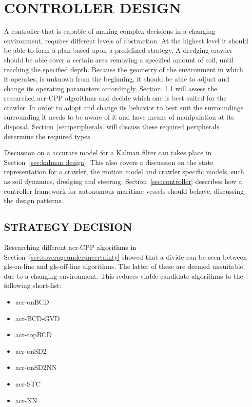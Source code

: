 \chapter{CONTROLLER DESIGN}\label{chap:controller design}

A controller that is capable of making complex decisions in a changing environment, requires different levels of
abstraction. At the highest level it should be able to form a plan based upon a predefined strategy. A dredging crawler
should be able cover a certain area removing a specified amount of soil, until reaching the specified depth. Because the
geometry of the environment in which it operates, is unknown from the beginning, it should be able to adjust and change
its operating parameters accordingly. Section~\ref{sec:strategy decision} will assess the researched \gls{acr-CPP}
algorithms and decide which one is best suited for the crawler. In order to adopt and change its behavior to best suit
the surroundings surrounding it needs to be aware of it and have means of manipulation at its disposal.
Section~\ref{sec:peripherals} will discuss these required peripherals determine the required types.

Discussion on a accurate model for a Kalman filter can takes place in Section~\ref{sec:kalman design}. This also covers
a discussion on the state representation for a crawler, the motion model and crawler specific models, such as soil
dynamics, dredging and steering. Section~\ref{sec:controller} describes how a controller framework for autonomous
maritime vessels should behave, discussing the design patterns.

\section{STRATEGY DECISION}\label{sec:strategy decision}

Researching different \gls{acr-CPP} algorithms in Section~\ref{sec:coverageunderuncertainty} showed that a divide can be
seen between \gls{gls-on-line} and \gls{gls-off-line} algorithms. The latter of these are deemed unsuitable, due to a
changing environment. This reduces viable candidate algorithms to the following short-list:

\begin{itemize}
	\setlength\itemsep{0mm}
	\item \gls{acr-onBCD}
	\item \gls{acr-BCD-GVD}
	\item \gls{acr-topBCD}
	\item \gls{acr-onSD2}
	\item \gls{acr-onSD2NN}
	\item \gls{acr-STC}
	\item \gls{acr-NN}
\end{itemize}

